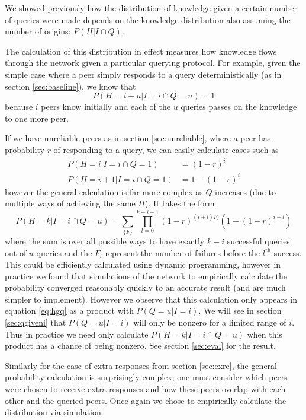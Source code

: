 \documentclass{article}
\newcommand{\eqnref}[1]{equation \eqref{eq:#1}}
\newcommand{\secref}[1]{section \ref{sec:#1}}
\begin{document}
We showed previously how the distribution of knowledge given a certain number of
queries were made depends on the knowledge distribution also assuming the number
of origins: $P(H|I\cap Q)$.

The calculation of this distribution in effect measures how knowledge flows
through the network given a particular querying protocol. For example, given
the simple case where a peer simply responds to a query deterministically (as
in \secref{baseline}), we know that
\begin{equation*}
	P(H=i+u|I=i\cap Q=u)=1
\end{equation*}
because $i$ peers know initially and each of the $u$ queries passes on the
knowledge to one more peer.

If we have unreliable peers as in \secref{unreliable}, where a peer has
probability $r$ of responding to a query, we can easily calculate cases such as
\begin{align*}
	P(H=i|I=i\cap Q=1)&=(1-r)^i\\
	P(H=i+1|I=i\cap Q=1)&=1-(1-r)^i
\end{align*}
however the general calculation is far more complex as $Q$ increases (due to
multiple ways of achieving the same $H$). It takes the form
\begin{equation*}
	P(H=k|I=i\cap Q=u)=\sum_{\{F\}}\prod_{l=0}^{k-i-1}(1-r)^{(i+l)F_l}(1-(1-r)^{i+l})
\end{equation*}
where the sum is over all possible ways to have exactly $k-i$ successful queries
out of $u$ queries and the $F_l$ represent the number of failures before the
$l^\text{th}$ success. This could be efficiently calculated using dynamic
programming, however in practice we found that simulations of the
network to empirically calculate the probability converged reasonably quickly to
an accurate result (and are much simpler to implement). However we observe that
this calculation only appears in \eqnref{hgq} as a product with $P(Q=u|I=i)$. We
will see in \secref{qgiveni} that $P(Q=u|I=i)$ will only be nonzero for a
limited range of $i$. Thus in practice we need only calculate $P(H=k|I=i\cap
Q=u)$ when this product has a chance of being nonzero. See \secref{eval} for the
result.

Similarly for the case of extra responses from \secref{exre}, the general
probability calculation is surprisingly complex; one must consider which peers
were chosen to receive extra responses and how these peers overlap with each
other and the queried peers. Once again we chose to empirically calculate the
distribution via simulation.
\end{document}
